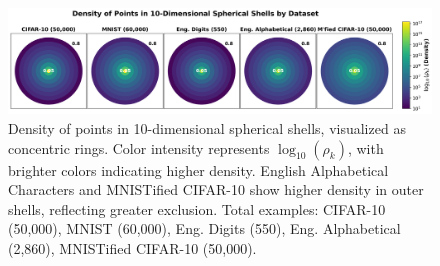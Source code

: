 \begin{figure}[ht]
    \centering
\includegraphics[width=0.99\columnwidth]{Figures/Results/density_rings.png}
\caption{Density of points in 10-dimensional spherical shells, visualized as concentric rings. Color intensity represents $\log_{10}(\rho_k)$, with brighter colors indicating higher density. English Alphabetical Characters and MNISTified CIFAR-10 show higher density in outer shells, reflecting greater exclusion. Total examples: CIFAR-10 (50,000), MNIST (60,000), Eng. Digits (550), Eng. Alphabetical (2,860), MNISTified CIFAR-10 (50,000).}
\label{fig:density_rings}
\end{figure}

